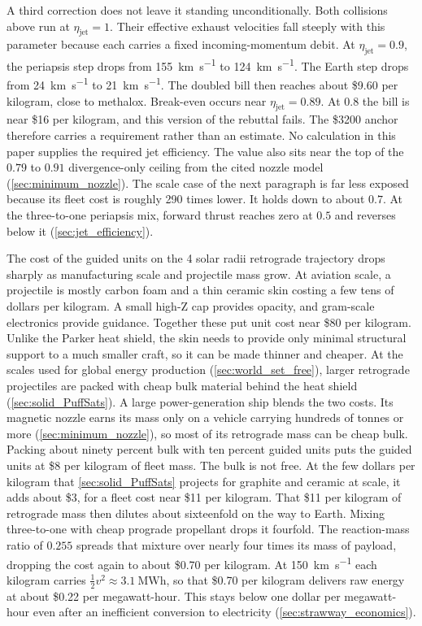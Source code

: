 \documentclass{article}
\begin{document}
A third correction does not leave it standing unconditionally. Both collisions above run at $\eta_{\mathrm{jet}} = 1$. Their effective exhaust velocities fall steeply with this parameter because each carries a fixed incoming-momentum debit. At $\eta_{\mathrm{jet}} = 0.9$, the periapsis step drops from \SI{155}{\kilo\meter\per\second} to \SI{124}{\kilo\meter\per\second}. The Earth step drops from \SI{24}{\kilo\meter\per\second} to \SI{21}{\kilo\meter\per\second}. The doubled bill then reaches about \$9.60 per kilogram, close to methalox. Break-even occurs near $\eta_{\mathrm{jet}} = 0.89$. At $0.8$ the bill is near \$16 per kilogram, and this version of the rebuttal fails. The \$3200 anchor therefore carries a requirement rather than an estimate. No calculation in this paper supplies the required jet efficiency. The value also sits near the top of the $0.79$ to $0.91$ divergence-only ceiling from the cited nozzle model (\autoref{sec:minimum_nozzle}). The scale case of the next paragraph is far less exposed because its fleet cost is roughly 290 times lower. It holds down to about $0.7$. At the three-to-one periapsis mix, forward thrust reaches zero at $0.5$ and reverses below it (\autoref{sec:jet_efficiency}).

The cost of the guided units on the 4 solar radii retrograde trajectory drops sharply as manufacturing scale and projectile mass grow. At aviation scale, a projectile is mostly carbon foam and a thin ceramic skin costing a few tens of dollars per kilogram. A small high-Z cap provides opacity, and gram-scale electronics provide guidance. Together these put unit cost near \$80 per kilogram. Unlike the Parker heat shield, the skin needs to provide only minimal structural support to a much smaller craft, so it can be made thinner and cheaper. At the scales used for global energy production (\autoref{sec:world_set_free}), larger retrograde projectiles are packed with cheap bulk material behind the heat shield (\autoref{sec:solid_PuffSats}). A large power-generation ship blends the two costs. Its magnetic nozzle earns its mass only on a vehicle carrying hundreds of tonnes or more (\autoref{sec:minimum_nozzle}), so most of its retrograde mass can be cheap bulk. Packing about ninety percent bulk with ten percent guided units puts the guided units at \$8 per kilogram of fleet mass. The bulk is not free. At the few dollars per kilogram that \autoref{sec:solid_PuffSats} projects for graphite and ceramic at scale, it adds about \$3, for a fleet cost near \$11 per kilogram. That \$11 per kilogram of retrograde mass then dilutes about sixteenfold on the way to Earth. Mixing three-to-one with cheap prograde propellant drops it fourfold. The reaction-mass ratio of $0.255$ spreads that mixture over nearly four times its mass of payload, dropping the cost again to about \$0.70 per kilogram. At \SI{150}{\kilo\meter\per\second} each kilogram carries $\tfrac{1}{2}v^2 \approx \SI{3.1}{\mega\watt\hour}$, so that \$0.70 per kilogram delivers raw energy at about \$0.22 per megawatt-hour. This stays below one dollar per megawatt-hour even after an inefficient conversion to electricity (\autoref{sec:strawway_economics}).
\end{document}
